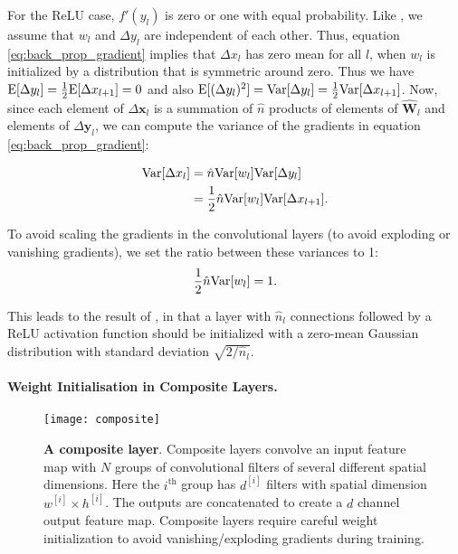 \documentclass[thesis]{subfiles}
\begin{document}
    For the ReLU case, $f'(y_l)$ is zero or one with equal probability. 
    Like \citet{glorot2010understanding}, we assume that $w_l$ and $\Delta y_l$ are independent of each other. Thus, equation \ref{eq:back_prop_gradient} implies that $\Delta x_l$ has zero mean for all $l$, when $w_l$ is initialized by a distribution that is symmetric around zero. Thus we have $\mathrm{E}[\Delta y_l] = \frac{1}{2}\mathrm{E}[\Delta x_{l+1}]= 0$ and also $\mathrm{E}[(\Delta y_l)^2] = \mathrm{Var}[\Delta y_l] = \frac{1}{2} \mathrm{Var}[\Delta x_{l+1}]$. Now, since each element of $\Delta \mathbf{x}_l$ is a summation of $\hat n$ products of elements of $\hat{\mathbf{W}}_l$ and elements of $\Delta \mathbf{y}_l$, we can compute the variance of the gradients in equation \ref{eq:back_prop_gradient}:
    
    \begin{equation}
    \begin{aligned}
    \mathrm{Var}[\Delta x_l] &=  \hat{n} \mathrm{Var}[w_l] \mathrm{Var}[\Delta y_l]\\
    &= \frac{1}{2}   \hat{n} \mathrm{Var}[w_l] \mathrm{Var} [\Delta x_{l+1}].
    \end{aligned}
    \end{equation}
    
    
    To avoid scaling the gradients in the convolutional layers (to avoid exploding or vanishing gradients), we set the ratio between these variances to 1:
    \begin{equation}
    \frac{1}{2} \hat{n} \mathrm{Var}[w_l] = 1.
    \end{equation}
    
    This leads to the result of \citet{journals/corr/HeZR015}, in that a layer with $\hat{n}_l$ connections followed by a ReLU activation function should be initialized with a zero-mean Gaussian distribution with standard deviation $\sqrt{2/ \hat{n}_l}$.
    
    \paragraph{Weight Initialisation in Composite Layers.}
    \begin{figure}[tb!]
        \centering
        \texttt{[image: composite]}
        \caption[Composite Layer.]{{\bf A composite layer}. Composite layers convolve an input feature map with $N$ groups of convolutional filters of several different spatial dimensions. Here the $i^\text{th}$ group has $d^{[i]}$ filters with spatial dimension $w^{[i]} \times h^{[i]}$. The outputs are concatenated to create a $d$ channel output feature map. Composite layers require careful weight initialization to avoid vanishing/exploding gradients during training.}
        \label{fig:compositelayers}
    \end{figure}
    
\end{document}
